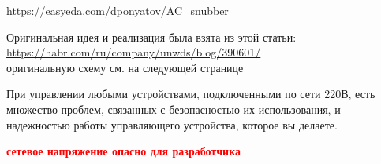 \label{AC_snubber}

\noindent\url{https://easyeda.com/dponyatov/AC_snubber}\medskip

\noindent
Оригинальная идея и реализация была взята из этой статьи:\\
\url{https://habr.com/ru/company/unwds/blog/390601/}\\
оригинальную схему см. на следующей странице

\medskip
При управлении любыми устройствами, подключенными по сети 220В, есть множество
проблем, связанных с безопасностью их использования, и надежностью работы
управляющего устройства, которое вы делаете.

\begin{framed}
\noindent
\begin{center}
\textbf{\textcolor{red}{сетевое напряжение опасно для разработчика}}
\end{center}
\end{framed}

\clearpage
\noindent{}
\clearpage
